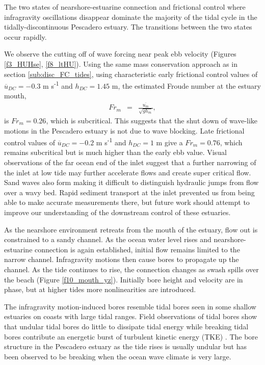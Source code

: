 The two states of nearshore-estuarine connection and frictional control
where infragravity oscillations disappear dominate the majority of
the tidal cycle in the tidally-discontinuous Pescadero estuary. The
transitions between the two states occur rapidly. 

We observe the cutting off of wave forcing near peak ebb velocity
(Figures \ref{f3_HUHse}, \ref{f8_ltHU}). Using the same mass conservation
approach as in section \ref{sub:disc_FC_tides}, using characteristic
early frictional control values of $\overline{{u}}{}_{DC}=-0.3$ m
s\textsuperscript{-1} and $h_{DC}=1.45$ m, the estimated Froude
number at the estuary mouth,
\begin{eqnarray}
Fr_{m} & = & \frac{\overline{u_{m}}}{\sqrt{gh_{m}}},\label{eq:Fr}
\end{eqnarray}
is $Fr_{m}=0.26$, which is subcritical. This suggests that the shut
down of wave-like motions in the Pescadero estuary is not due to wave
blocking. Late frictional control values of $\overline{{u}}{}_{DC}=-0.2$
m s\textsuperscript{-1} and $h_{DC}=1$ m give a $Fr_{m}=0.76$,
which remains subcritical but is much higher than the early ebb value.
Visual observations of the far ocean end of the inlet suggest that
a further narrowing of the inlet at low tide may further accelerate
flows and create super critical flow. Sand waves also form making
it difficult to distinguish hydraulic jumps from flow over a wavy
bed. Rapid sediment transport at the inlet prevented us from being
able to make accurate measurements there, but future work should attempt
to improve our understanding of the downstream control of these estuaries. 

As the nearshore environment retreats from the mouth of the estuary,
flow out is constrained to a sandy channel. As the ocean water level
rises and nearshore-estuarine connection is again established, initial
flow remains limited to the narrow channel. Infragravity motions then
cause bores to propagate up the channel. As the tide continues to
rise, the connection changes as swash spills over the beach (Figure
\ref{f10_mouth_yz}). Initially bore height and velocity are in phase,
but at higher tides more nonlinearities are introduced.

The infragravity motion-induced bores resemble tidal bores seen in
some shallow estuaries on coasts with large tidal ranges. Field observations
of tidal bores show that undular tidal bores do little to dissipate
tidal energy \parencite{wolanski_undular_2004} while breaking tidal bores
contribute an energetic burst of turbulent kinetic energy (TKE) \parencite{simpson_reynolds_2004}. The bore structure in the Pescadero estuary as the tide rises is usually undular but has been observed to be breaking when the ocean wave climate is very large. 


